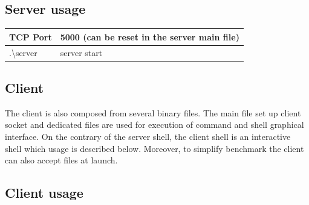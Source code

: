 \documentclass[a4paper,11pt]{report}
\begin{document}
    \subsection*{Server usage}

    \begin{centering}
        \begin{tabular}{|m{3cm}|m{7cm}|}
            \hline
            TCP Port & 5000 (can be reset in the server main file) \\
            \hline
            .\textbackslash server & server start \\
            \hline
        \end{tabular}
    \end{centering}

    \subsection*{Client}
    The client is also composed from several binary files.
    The main file set up client socket and dedicated files are used for execution of command and shell graphical
    interface.
    On the contrary of the server shell, the client shell is an interactive shell which usage is described below.
    Moreover, to simplify benchmark the client can also accept files at launch.

    \subsection*{Client usage}
\end{document}
